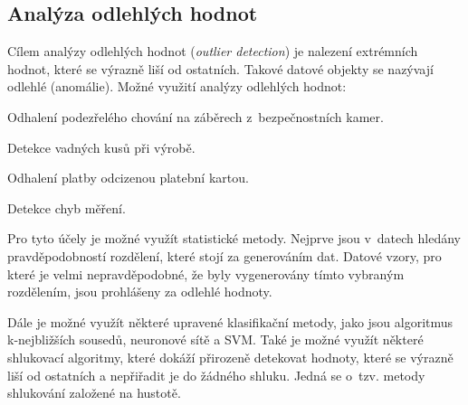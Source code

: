 \subsection{Analýza odlehlých hodnot}

Cílem analýzy odlehlých hodnot (\textit{outlier detection}) je nalezení extrémních hodnot, které se výrazně liší od ostatních. Takové datové objekty se nazývají odlehlé (anomálie). Možné využití analýzy odlehlých hodnot:

\begin{compactitem}
    \item Odhalení podezřelého chování na záběrech z~bezpečnostních kamer.

    \item Detekce vadných kusů při výrobě.

    \item Odhalení platby odcizenou platební kartou.

    \item Detekce chyb měření.
\end{compactitem}

Pro tyto účely je možné využít statistické metody. Nejprve jsou v~datech hledány pravděpodobností rozdělení, které stojí za generováním dat. Datové vzory, pro které je velmi nepravděpodobné, že byly vygenerovány tímto vybraným rozdělením, jsou prohlášeny za odlehlé hodnoty.

Dále je možné využít některé upravené klasifikační metody, jako jsou algoritmus k-nejbližších sousedů, neuronové sítě a SVM. Také je možné využít některé shlukovací algoritmy, které dokáží přirozeně detekovat hodnoty, které se výrazně liší od ostatních a nepřiřadit je do žádného shluku. Jedná se o~tzv. metody shlukování založené na hustotě.
